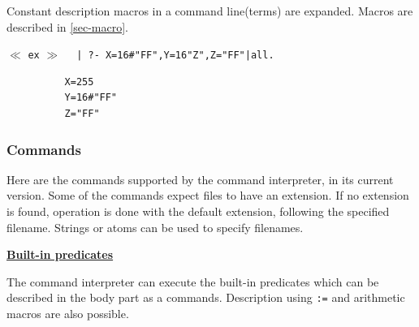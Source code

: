 Constant description macros in a command line(terms) are expanded.
Macros are described in \ref{sec-macro}.\vspace{1ex}

$\ll$ \verb|ex| $\gg$ \verb!  | ?- X=16#"FF",Y=16"Z",Z="FF"|all.!
\begin{verbatim}
          X=255
          Y=16#"FF"
          Z="FF"
\end{verbatim}

\subsubsection{Commands}

Here are the commands supported by the command interpreter, in its current
version.
Some of the commands expect files to have an extension.
If no extension is found, operation is done with the default extension,
following the specified filename.
Strings or atoms can be used to specify filenames.
\vspace{1ex}

\noindent\underline{\bf Built-in predicates}
\vspace{1ex}\par
The command interpreter can execute the built-in predicates
which can be described
in the body part as a commands.
Description using \verb|:=| and arithmetic macros are also possible.
\vspace{1ex}

